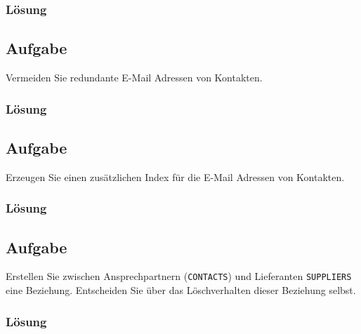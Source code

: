 \subsubsection*{Lösung}
\label{sec:uebung_05.aufgabe_03.loesung}

\subsection{Aufgabe}
\label{sec:uebung_05.aufgabe_04}
Vermeiden Sie redundante E-Mail Adressen von Kontakten.

\subsubsection*{Lösung}
\label{sec:uebung_05.aufgabe_04.loesung}

\subsection{Aufgabe}
\label{sec:uebung_05.aufgabe_05}
Erzeugen Sie einen zusätzlichen Index für die E-Mail Adressen von Kontakten.

\subsubsection*{Lösung}
\label{sec:uebung_05.aufgabe_05.loesung}

\subsection{Aufgabe}
\label{sec:uebung_05.aufgabe_06}
Erstellen Sie zwischen Ansprechpartnern (\texttt{CONTACTS}) und Lieferanten \texttt{SUPPLIERS} eine Beziehung. Entscheiden Sie über das Löschverhalten dieser Beziehung selbst.

\subsubsection*{Lösung}
\label{sec:uebung_05.aufgabe_06.loesung}
